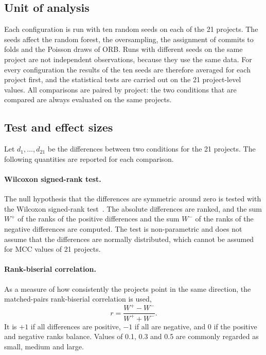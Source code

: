 \documentclass[12pt,a4paper,oneside]{report}
\begin{document}
\subsection{Unit of analysis}

Each configuration is run with ten random seeds on each of the 21 projects.
The seeds affect the random forest, the oversampling, the assignment of
commits to folds and the Poisson draws of ORB. Runs with different seeds on
the same project are not independent observations, because they use the same
data. For every configuration the results of the ten seeds are therefore
averaged for each project first, and the statistical tests are carried out on
the 21 project-level values. All comparisons are paired by project: the two
conditions that are compared are always evaluated on the same projects.

\subsection{Test and effect sizes}

Let $d_1,\dots,d_{21}$ be the differences between two conditions for the 21
projects. The following quantities are reported for each comparison.

\paragraph{Wilcoxon signed-rank test.} The null hypothesis that the
differences are symmetric around zero is tested with the Wilcoxon signed-rank
test~\cite{wilcoxon1945}. The absolute differences are ranked, and the sum
$W^{+}$ of the ranks of the positive differences and the sum $W^{-}$ of the
ranks of the negative differences are computed. The test is non-parametric
and does not assume that the differences are normally distributed, which
cannot be assumed for MCC values of 21 projects.

\paragraph{Rank-biserial correlation.} As a measure of how consistently the
projects point in the same direction, the matched-pairs rank-biserial
correlation is used,
\begin{equation}
r = \frac{W^{+} - W^{-}}{W^{+} + W^{-}}.
\end{equation}
It is $+1$ if all differences are positive, $-1$ if all are negative, and 0
if the positive and negative ranks balance. Values of 0.1, 0.3 and 0.5 are
commonly regarded as small, medium and large.
\end{document}
